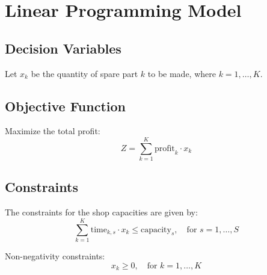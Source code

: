 \documentclass{article}
\begin{document}
\section*{Linear Programming Model}

\subsection*{Decision Variables}
Let \( x_k \) be the quantity of spare part \( k \) to be made, where \( k = 1, \ldots, K \).

\subsection*{Objective Function}
Maximize the total profit:
\[
Z = \sum_{k=1}^{K} \text{profit}_k \cdot x_k
\]

\subsection*{Constraints}
The constraints for the shop capacities are given by:
\[
\sum_{k=1}^{K} \text{time}_{k, s} \cdot x_k \leq \text{capacity}_s, \quad \text{for } s = 1, \ldots, S
\]

Non-negativity constraints:
\[
x_k \geq 0, \quad \text{for } k = 1, \ldots, K
\]
\end{document}
